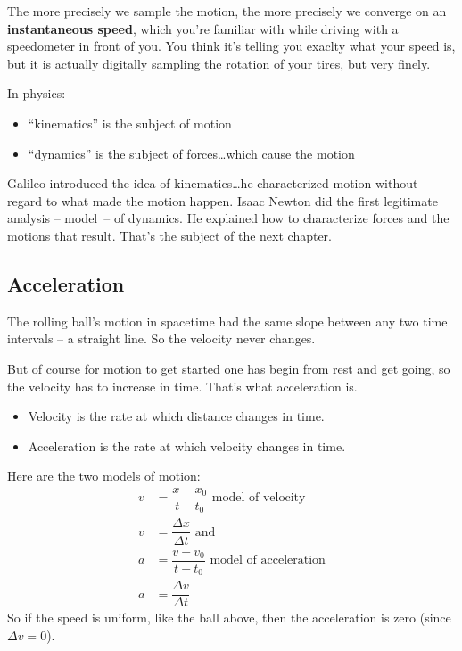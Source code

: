 \documentclass[
  letterpaper,
  DIV=11,
  numbers=noendperiod,
  oneside]{scrreprt}
\providecommand{\tightlist}{%
  \setlength{\itemsep}{0pt}\setlength{\parskip}{0pt}}\usepackage{longtable,booktabs,array}
\begin{document}
The more precisely we sample the motion, the more precisely we converge
on an \textbf{instantaneous speed}, which you're familiar with while
driving with a speedometer in front of you. You think it's telling you
exaclty what your speed is, but it is actually digitally sampling the
rotation of your tires, but very finely.

In physics:

\begin{itemize}
\tightlist
\item
  ``kinematics'' is the subject of motion
\item
  ``dynamics'' is the subject of forces\ldots which cause the motion
\end{itemize}

Galileo introduced the idea of kinematics\ldots he characterized motion
without regard to what made the motion happen. Isaac Newton did the
first legitimate analysis -- model~-- of dynamics. He explained how to
characterize forces and the motions that result. That's the subject of
the next chapter.

\subsection{Acceleration}\label{acceleration}

The rolling ball's motion in spacetime had the same slope between any
two time intervals -- a straight line. So the velocity never changes.

But of course for motion to get started one has begin from rest and get
going, so the velocity has to increase in time. That's what acceleration
is.

\begin{itemize}
\tightlist
\item
  Velocity is the rate at which distance changes in time.
\item
  Acceleration is the rate at which velocity changes in time.
\end{itemize}

Here are the two models of motion: \[
\begin{align}
v &=\dfrac{x-x_0}{t-t_0} \text{  model of velocity} \label{eq1} \\
v &= \dfrac{\Delta x}{\Delta t} \text{ and } \nonumber \\
a &=\dfrac{v-v_0}{t-t_0}  \text{  model of acceleration} \nonumber \\
a &= \dfrac{\Delta v}{\Delta t} \nonumber
\end{align}
\] So if the speed is uniform, like the ball above, then the
acceleration is zero (since \(\Delta v = 0\)).
\end{document}
